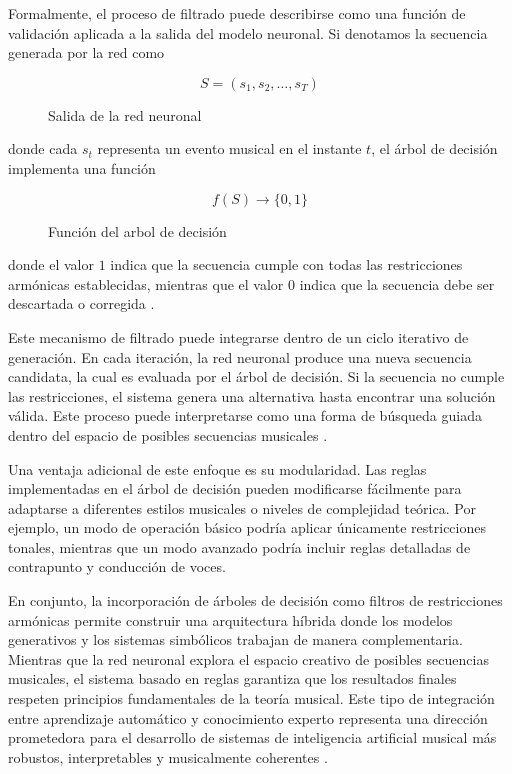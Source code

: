 \documentclass[12pt]{report}
\begin{document}
Formalmente, el proceso de filtrado puede describirse como una función de validación aplicada a la salida del modelo neuronal. Si denotamos la secuencia generada por la red como
\begin{figure}[h]
\centering
\[
S = (s_1, s_2, \dots, s_T)
\]
\caption{Salida de la red neuronal}
\end{figure}


donde cada $s_t$ representa un evento musical en el instante $t$, el árbol de decisión implementa una función

\begin{figure}[h]
\centering
\[
f(S) \rightarrow \{0,1\}
\]
\caption{Función del arbol de decisión}
\end{figure}


donde el valor $1$ indica que la secuencia cumple con todas las restricciones armónicas establecidas, mientras que el valor $0$ indica que la secuencia debe ser descartada o corregida \cite{herremans2017morpheus}.

Este mecanismo de filtrado puede integrarse dentro de un ciclo iterativo de generación. En cada iteración, la red neuronal produce una nueva secuencia candidata, la cual es evaluada por el árbol de decisión. Si la secuencia no cumple las restricciones, el sistema genera una alternativa hasta encontrar una solución válida. Este proceso puede interpretarse como una forma de búsqueda guiada dentro del espacio de posibles secuencias musicales \cite{hadjeres2017deepbach}.

Una ventaja adicional de este enfoque es su modularidad. Las reglas implementadas en el árbol de decisión pueden modificarse fácilmente para adaptarse a diferentes estilos musicales o niveles de complejidad teórica. Por ejemplo, un modo de operación básico podría aplicar únicamente restricciones tonales, mientras que un modo avanzado podría incluir reglas detalladas de contrapunto y conducción de voces.

En conjunto, la incorporación de árboles de decisión como filtros de restricciones armónicas permite construir una arquitectura híbrida donde los modelos generativos y los sistemas simbólicos trabajan de manera complementaria. Mientras que la red neuronal explora el espacio creativo de posibles secuencias musicales, el sistema basado en reglas garantiza que los resultados finales respeten principios fundamentales de la teoría musical. Este tipo de integración entre aprendizaje automático y conocimiento experto representa una dirección prometedora para el desarrollo de sistemas de inteligencia artificial musical más robustos, interpretables y musicalmente coherentes \cite{garcez2020neurosymbolic}.
\end{document}
